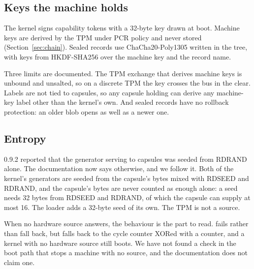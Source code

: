 \subsection{Keys the machine holds}

The kernel signs capability tokens with a 32-byte key drawn at boot. Machine keys are derived by the TPM under PCR policy and never stored (Section~\ref{sec:chain}). Sealed records use ChaCha20-Poly1305 written in the tree, with keys from HKDF-SHA256 over the machine key and the record name.

Three limits are documented. The TPM exchange that derives machine keys is unbound and unsalted, so on a discrete TPM the key crosses the bus in the clear. Labels are not tied to capsules, so any capsule holding  can derive any machine-key label other than the kernel's own. And sealed records have no rollback protection: an older blob opens as well as a newer one.

\subsection{Entropy}

0.9.2 reported that the generator serving  to capsules was seeded from RDRAND alone. The documentation now says otherwise, and we follow it. Both of the kernel's generators are seeded from the  capsule's bytes mixed with RDSEED and RDRAND, and the capsule's bytes are never counted as enough alone: a seed needs 32 bytes from RDSEED and RDRAND, of which the capsule can supply at most 16. The loader adds a 32-byte seed of its own. The TPM is not a source.

When no hardware source answers, the behaviour is the part to read.  fails rather than fall back, but  falls back to the cycle counter XORed with a counter, and a kernel with no hardware source still boots. We have not found a check in the boot path that stops a machine with no source, and the documentation does not claim one.
